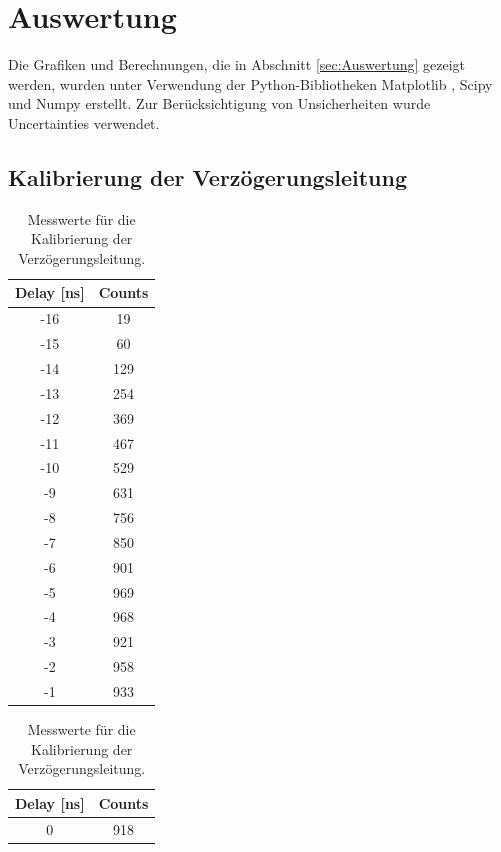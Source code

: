 \section{Auswertung}
\label{sec:Auswertung}
Die Grafiken und Berechnungen, die in Abschnitt \autoref{sec:Auswertung} gezeigt werden, wurden unter Verwendung der Python-Bibliotheken Matplotlib \cite{matplotlib}, Scipy \cite{scipy} und Numpy \cite{numpy} erstellt. 
Zur Berücksichtigung von Unsicherheiten wurde Uncertainties \cite{uncertainties} verwendet.

\subsection{Kalibrierung der Verzögerungsleitung}

\begin{table}[htbp]
  \centering
  \caption{Messwerte für die Kalibrierung der Verzögerungsleitung.}
  \label{tab:kalibrierung}
  \centering
  \begin{minipage}[t]{0.45\linewidth}
    \centering
    \begin{tabular}{c|c}
      \hline
      \textbf{Delay [ns]} & \textbf{Counts} \\
      \hline
      -16 & 19\\
      -15 & 60\\
      -14 & 129\\
      -13 & 254\\
      -12 & 369\\
      -11 & 467\\
      -10 & 529\\
      -9 & 631\\
      -8 & 756\\
      -7 & 850\\
      -6 & 901\\
      -5 & 969\\
      -4 & 968\\
      -3 & 921\\
      -2 & 958\\
      -1 & 933\\
      \hline
    \end{tabular}
  \end{minipage}
  \begin{minipage}[t]{0.45\linewidth}
    \centering
    \begin{tabular}{c|c}
      \hline
      \textbf{Delay [ns]} & \textbf{Counts} \\
      \hline
      0 & 918\\

\end{tabular}
\end{minipage}
\end{table}
